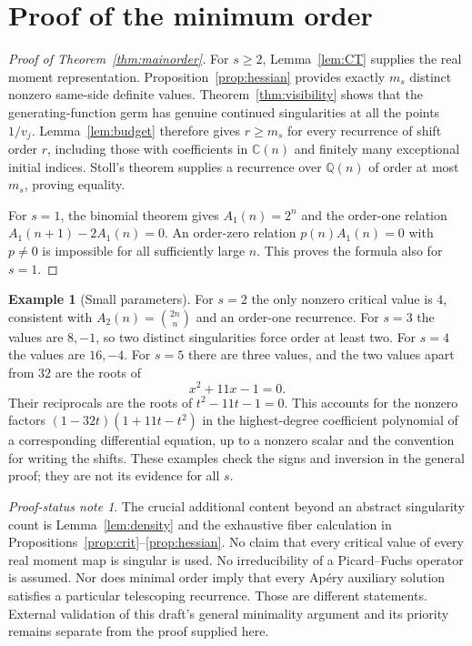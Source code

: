 \documentclass[11pt,a4paper]{article}
\theoremstyle{definition}\newtheorem{definition}[theorem]{Definition}
\newtheorem{example}[theorem]{Example}
\theoremstyle{remark}\newtheorem{remark}[theorem]{Remark}
\newtheorem{audit}[theorem]{Proof-status note}
\newcommand{\Q}{\mathbb Q}\newcommand{\Z}{\mathbb Z}\newcommand{\N}{\mathbb N}\newcommand{\R}{\mathbb R}\newcommand{\C}{\mathbb C}
\begin{document}
\section{Proof of the minimum order}\label{sec:orderproof}
\begin{proof}[Proof of Theorem~\ref{thm:mainorder}]
For $s\ge2$, Lemma~\ref{lem:CT} supplies the real moment representation.
Proposition~\ref{prop:hessian} provides exactly $m_s$ distinct nonzero same-side
definite values. Theorem~\ref{thm:visibility} shows that the generating-function
germ has genuine continued singularities at all the points $1/v_j$.
Lemma~\ref{lem:budget} therefore gives $r\ge m_s$ for every recurrence of
shift order $r$, including those with coefficients in $\C(n)$ and finitely
many exceptional initial indices. Stoll's theorem \cite{Stoll} supplies a
recurrence over $\Q(n)$ of order at most $m_s$, proving equality.

For $s=1$, the binomial theorem gives $A_1(n)=2^n$ and the order-one relation
$A_1(n+1)-2A_1(n)=0$. An order-zero relation $p(n)A_1(n)=0$ with $p\ne0$
is impossible for all sufficiently large $n$. This proves the formula also
for $s=1$.
\end{proof}

\begin{example}[Small parameters]\label{ex:small}
For $s=2$ the only nonzero critical value is $4$, consistent with
$A_2(n)=\binom{2n}{n}$ and an order-one recurrence. For $s=3$ the values are
$8,-1$, so two distinct singularities force order at least two. For $s=4$ the
values are $16,-4$. For $s=5$ there are three values, and the two values apart
from $32$ are the roots of
\[
 x^2+11x-1=0.
\]
Their reciprocals are the roots of $t^2-11t-1=0$. This accounts for the
nonzero factors $(1-32t)(1+11t-t^2)$ in the highest-degree coefficient
polynomial of a corresponding differential equation, up to a nonzero scalar
and the convention for writing the shifts. These examples check the signs
and inversion in the general proof; they are not its evidence for all $s$.
\end{example}

\begin{audit}
The crucial additional content beyond an abstract singularity count is
Lemma~\ref{lem:density} and the exhaustive fiber calculation in
Propositions~\ref{prop:crit}--\ref{prop:hessian}. No claim that every critical
value of every real moment map is singular is used. No irreducibility of a
Picard--Fuchs operator is assumed. Nor does minimal order imply that every
Ap\'ery auxiliary solution satisfies a particular telescoping recurrence.
Those are different statements. External validation of this draft's general
minimality argument and its priority remains separate from the proof supplied
here.
\end{audit}
\end{document}
